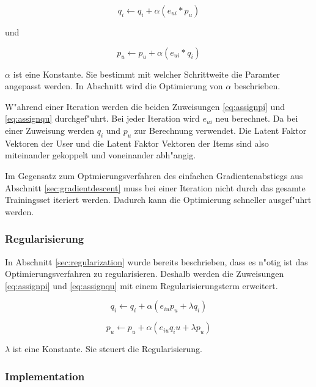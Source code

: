 \documentclass[a4paper, 12pt]{article}
\begin{document}
\begin{equation}
  \label{eq:assignpi}
 q_i \leftarrow q_i + \alpha (e_{ui} * p_u)
\end{equation}

und

\begin{equation}
  \label{eq:assignqu}
 p_u \leftarrow p_u + \alpha (e_{ui} * q_i)
\end{equation}

$\alpha$ ist eine Konstante. Sie bestimmt mit welcher Schrittweite die Paramter angepasst werden. In Abschnitt \label{sec:results} wird die Optimierung von $\alpha$ beschrieben.

W"ahrend einer Iteration werden die beiden Zuweisungen \ref{eq:assignpi} und \ref{eq:assignqu} durchgef"uhrt. Bei jeder Iteration wird $e_{ui}$ neu berechnet. Da bei einer Zuweisung werden $q_i$ und $p_u$ zur Berechnung verwendet. Die Latent Faktor Vektoren der User und die Latent Faktor Vektoren der Items sind also miteinander gekoppelt und voneinander abh"angig.

Im Gegensatz zum Optmierungsverfahren des einfachen Gradientenabstiegs aus Abschnitt \ref{sec:gradientdescent} muss bei einer Iteration nicht durch das gesamte Trainingsset iteriert werden. Dadurch kann die Optimierung schneller ausgef"uhrt werden.

\subsubsection{Regularisierung}
\label{sec:regularization2}

In Abschnitt \ref{sec:regularization} wurde bereits beschrieben, dass es n"otig ist das Optimierungsverfahren zu regularisieren. Deshalb werden die Zuweisungen \ref{eq:assignpi} und \ref{eq:assignqu} mit einem Regularisierungsterm erweitert.

\begin{equation}
  \label{eq:assign2}
  q_i \leftarrow q_i + \alpha (e_{iu} p_u + \lambda q_i)
\end{equation}

\begin{equation}
  \label{eq:assign3}
    p_u \leftarrow p_u + \alpha (e_{iu} q_iu + \lambda p_u)
\end{equation}

$\lambda$ ist eine Konstante. Sie steuert die Regularisierung. 

\subsubsection{Implementation}
\label{sec:sgdimpl}
\end{document}
